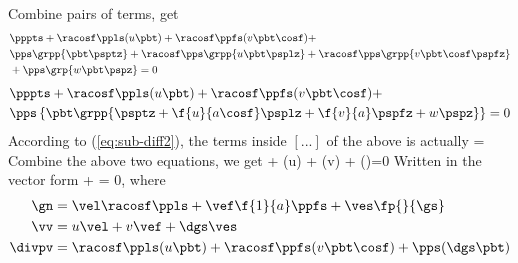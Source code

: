 Combine pairs of terms, get
\begin{align}
  &\pppts + \racosf \ppls(u\pbt) + \racosf\ppfs(v\pbt\cosf) +\notag \\
  &\pps\grpp{\pbt\psptz}+\racosf\pps\grpp{u\pbt\psplz}+\racosf\pps\grpp{v\pbt\cosf\pspfz}
  \notag\\
  &+\pps\grp{w\pbt\pspz}=0
\end{align}
\begin{align}
  &\pppts + \racosf \ppls(u\pbt) + \racosf\ppfs(v\pbt\cosf) +\notag \\
  &\pps\left\{\pbt\grpp{\psptz+\f{u}{a\cosf}\psplz+\f{v}{a}\pspfz+w\pspz}\right\}=0
\end{align}
According to (\ref{eq:sub-diff2}), the terms inside $[...]$ of the above is
actually
\beeq
\dsdtz=\dgs
\eneq
Combine the above two equations, we get
\beeq
\pppts + \racosf \ppls(u\pbt) + \racosf\ppfs(v\pbt\cosf) + \pps(\dgs\pbt)=0
\eneq
Written in the vector form
\beeq
\pppts + \divpv = 0,
\eneq
where
\begin{align}
  \gn &=\vel\racosf\ppls+\vef\f{1}{a}\ppfs+\ves\fp{}{\gs} \\
  \vv &= u\vel+v\vef+\dgs\ves \\
  \divpv &= \racosf \ppls(u\pbt) + \racosf\ppfs(v\pbt\cosf) + \pps(\dgs\pbt)
\end{align}
